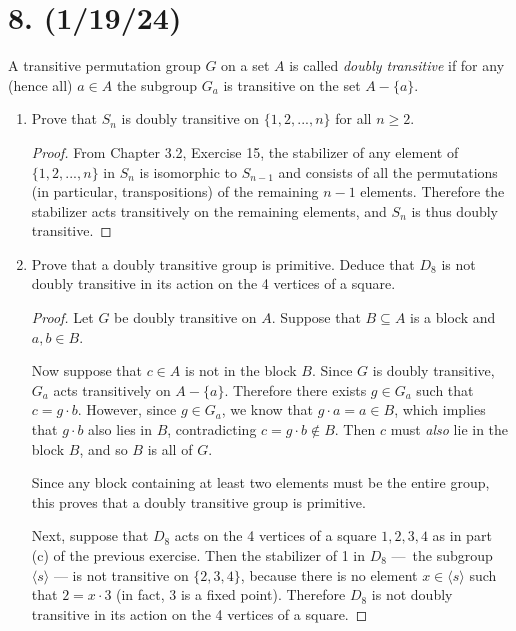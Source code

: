 \documentclass{article}
\begin{document}
\section*{8. (1/19/24)}

A transitive permutation group $G$ on a set $A$ is called \emph{doubly transitive} if for any (hence all) $a \in A$ the subgroup $G_a$ is transitive on the set $A - \{ a \}$.

\begin{enumerate}[itemsep=0em, label=(\alph*)]
    \item Prove that $S_n$ is doubly transitive on $\{ 1, 2, ..., n \}$ for all $n \geq 2$.
        \begin{proof}
            From Chapter 3.2, Exercise 15, the stabilizer of any element of $\{ 1, 2, ..., n \}$ in $S_n$ is isomorphic to $S_{n - 1}$ and consists of all the permutations (in particular, transpositions) of the remaining $n - 1$ elements. Therefore the stabilizer acts transitively on the remaining elements, and $S_n$ is thus doubly transitive.
        \end{proof}
    \item Prove that a doubly transitive group is primitive. Deduce that $D_8$ is not doubly transitive in its action on the 4 vertices of a square.
        \begin{proof}
            Let $G$ be doubly transitive on $A$. Suppose that $B \subseteq A$ is a block and $a, b \in B$.

            Now suppose that $c \in A$ is not in the block $B$. Since $G$ is doubly transitive, $G_a$ acts transitively on $A - \{ a \}$. Therefore there exists $g \in G_a$ such that $c = g \cdot b$. However, since $g \in G_a$, we know that $g \cdot a = a \in B$, which implies that $g \cdot b$ also lies in $B$, contradicting $c = g \cdot b \notin B$. Then $c$ must \emph{also} lie in the block $B$, and so $B$ is all of $G$.

            Since any block containing at least two elements must be the entire group, this proves that a doubly transitive group is primitive.

            Next, suppose that $D_8$ acts on the 4 vertices of a square $1, 2, 3, 4$ as in part (c) of the previous exercise. Then the stabilizer of 1 in $D_8$ — the subgroup $\langle s \rangle$ — is not transitive on $\{ 2, 3, 4 \}$, because there is no element $x \in \langle s \rangle$ such that $2 = x \cdot 3$ (in fact, 3 is a fixed point). Therefore $D_8$ is not doubly transitive in its action on the 4 vertices of a square.
        \end{proof}
\end{enumerate} 
\end{document}
